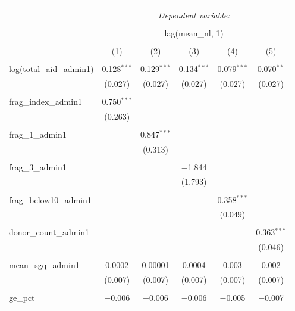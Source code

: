 
\begin{table}[!htbp] \centering 
  \caption{} 
  \label{} 
\begin{tabular}{@{\extracolsep{5pt}}lccccc} 
\\[-1.8ex]\hline 
\hline \\[-1.8ex] 
 & \multicolumn{5}{c}{\textit{Dependent variable:}} \\ 
\cline{2-6} 
\\[-1.8ex] & \multicolumn{5}{c}{lag(mean\_nl, 1)} \\ 
\\[-1.8ex] & (1) & (2) & (3) & (4) & (5)\\ 
\hline \\[-1.8ex] 
 log(total\_aid\_admin1) & 0.128$^{***}$ & 0.129$^{***}$ & 0.134$^{***}$ & 0.079$^{***}$ & 0.070$^{**}$ \\ 
  & (0.027) & (0.027) & (0.027) & (0.027) & (0.027) \\ 
  & & & & & \\ 
 frag\_index\_admin1 & 0.750$^{***}$ &  &  &  &  \\ 
  & (0.263) &  &  &  &  \\ 
  & & & & & \\ 
 frag\_1\_admin1 &  & 0.847$^{***}$ &  &  &  \\ 
  &  & (0.313) &  &  &  \\ 
  & & & & & \\ 
 frag\_3\_admin1 &  &  & $-$1.844 &  &  \\ 
  &  &  & (1.793) &  &  \\ 
  & & & & & \\ 
 frag\_below10\_admin1 &  &  &  & 0.358$^{***}$ &  \\ 
  &  &  &  & (0.049) &  \\ 
  & & & & & \\ 
 donor\_count\_admin1 &  &  &  &  & 0.363$^{***}$ \\ 
  &  &  &  &  & (0.046) \\ 
  & & & & & \\ 
 mean\_sgq\_admin1 & 0.0002 & 0.00001 & 0.0004 & 0.003 & 0.002 \\ 
  & (0.007) & (0.007) & (0.007) & (0.007) & (0.007) \\ 
  & & & & & \\ 
 ge\_pct & $-$0.006 & $-$0.006 & $-$0.006 & $-$0.005 & $-$0.007 \\ 

\end{tabular}
\end{table}
